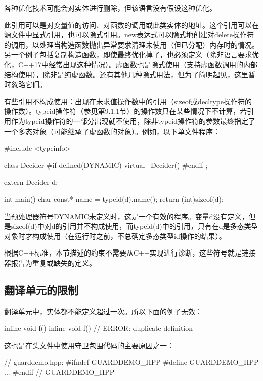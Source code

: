 \begin{notice}
各种优化技术可能会对实体进行删除，但该语言没有假设这种优化。
\end{notice}

此引用可以是对变量值的访问、对函数的调用或此类实体的地址。这个引用可以在源文件中显式引用，也可以隐式引用。new表达式可以隐式地创建对delete操作符的调用，以处理当构造函数抛出异常要求清理未使用（但已分配）内存时的情况。另一个例子包括复制构造函数，即使最终优化掉了，也必须定义（除非语言要求优化，C++17中经常出现这种情况）。虚函数也是隐式使用（支持虚函数调用的内部结构使用），除非是纯虚函数。还有其他几种隐式用法，但为了简明起见，这里暂时忽略它们。

有些引用不构成使用：出现在未求值操作数中的引用（sizeof或decltype操作符的操作数）。typeid操作符（参见第9.1.1节）的操作数只在某些情况下不计算，若引用作为typeid操作符的一部分出现就不使用，除非typeid操作符的参数最终指定了一个多态对象（可能继承了虚函数的对象）。例如，以下单文件程序：

\begin{cpp}
#include <typeinfo>

class Decider {
	#if defined(DYNAMIC)
	virtual ~Decider() {
	}
	#endif
};

extern Decider d;

int main()
{
	char const* name = typeid(d).name();
	return (int)sizeof(d);
}
\end{cpp}

当预处理器符号DYNAMIC未定义时，这是一个有效的程序。变量d没有定义，但是sizeof(d)中对d的引用并不构成使用，而typeid(d)中的引用，只有在d是多态类型对象时才构成使用（在运行时之前，不总确定多态类型id操作的结果）。

根据C++标准，本节描述的约束不需要从C++实现进行诊断，这些符号就是链接器报告为重复或缺失的定义。

\subsection{翻译单元的限制}

翻译单元中，实体都不能定义超过一次。所以下面的例子无效：

\begin{cpp}
inline void f() {}
inline void f() {} // ERROR: duplicate definition
\end{cpp}

这也是在头文件中使用守卫包围代码的主要原因之一：

\begin{cpp}
// guarddemo.hpp:
#ifndef GUARDDEMO_HPP
#define GUARDDEMO_HPP
...
#endif // GUARDDEMO_HPP
\end{cpp}

